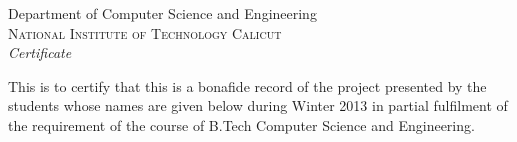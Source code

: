 \documentclass[10pt]{report}
\begin{document}

%
%
%
%
%






\newpage
\thispagestyle{empty}

\begin{center}

\LARGE{Department of Computer Science and Engineering}\\
\normalsize
\textsc{National Institute of Technology Calicut}\\[2.0cm]

\emph{\LARGE Certificate}\\[2.5cm]
\end{center}
\normalsize This is to certify that this is a bonafide record of the project presented by the students whose names are given below during Winter 2013 in partial fulfilment of the requirement of the course of B.Tech Computer Science and Engineering.\\[1.0cm]
\end{document}
